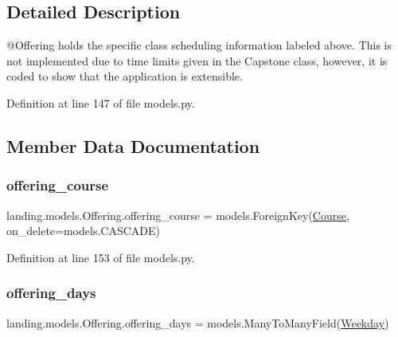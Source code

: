 \subsection{Detailed Description}
\begin{DoxyVerb}@Offering holds the specific class scheduling information labeled above.
        This is not implemented due to time limits given in the Capstone class,
        however, it is coded to show that the application is extensible.
\end{DoxyVerb}
 

Definition at line 147 of file models.\+py.



\subsection{Member Data Documentation}
\mbox{\label{classlanding_1_1models_1_1Offering_a61ee20a63d849a004c9aaa3b8aa00a42}} 
\subsubsection{\texorpdfstring{offering\+\_\+course}{offering\_course}}
{\footnotesize\ttfamily landing.\+models.\+Offering.\+offering\+\_\+course = models.\+Foreign\+Key(\mbox{\hyperlink{classlanding_1_1models_1_1Course}{Course}}, on\+\_\+delete=models.\+C\+A\+S\+C\+A\+DE)\hspace{0.3cm}{\ttfamily [static]}}



Definition at line 153 of file models.\+py.

\mbox{\label{classlanding_1_1models_1_1Offering_a2680068b2c5f2feb7fe159f59a642d20}} 
\subsubsection{\texorpdfstring{offering\+\_\+days}{offering\_days}}
{\footnotesize\ttfamily landing.\+models.\+Offering.\+offering\+\_\+days = models.\+Many\+To\+Many\+Field(\mbox{\hyperlink{classlanding_1_1models_1_1Weekday}{Weekday}})\hspace{0.3cm}{\ttfamily [static]}}



